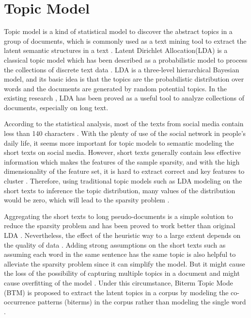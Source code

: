 \section{Topic Model}\label{topicmodel}
Topic model is a kind of statistical model to discover the abstract topics in a group of documents, which is commonly used as a text mining tool to extract the latent semantic structures in a text \cite{enwiki:1014350876}. Latent Dirichlet Allocation(LDA) is a classical topic model which has been described as a probabilistic model to process the collections of discrete text data \cite{blei2003latent}. LDA is a three-level hierarchical Bayesian model, and its basic idea is that the topics are the probabilistic distribution over words and the documents are generated by random potential topics. In the existing research \cite{wallach2009rethinking}, LDA has been proved as a useful tool to analyze collections of documents, especially on long text.

According to the statistical analysis, most of the texts from social media contain less than 140 characters \cite{clark2016sifting}. With the plenty of use of the social network in people's daily life, it seems more important for topic models to semantic modeling the short texts on social media. However, short texts generally contain less effective information which makes the features of the sample sparsity, and with the high dimensionality of the feature set, it is hard to extract correct and key features to cluster \cite{tommasel2018short}. Therefore, using traditional topic models such as LDA modeling on the short texts 
to inference the topic distribution, many values of the distribution would be zero, which will lead to the sparsity problem \cite{tang2014understanding}.

Aggregating the short texts to long pseudo-documents is a simple solution to reduce the sparsity problem and has been proved to work better than original LDA \cite{hong2010empirical}. Nevertheless, the effect of the heuristic way to a large extent depends on the quality of data \cite{cheng2014btm}. Adding strong assumptions on the short texts such as assuming each word in the same sentence has the same topic \cite{gruber2007hidden} is also helpful to alleviate the sparsity problem since it can simplify the model. But it might cause the loss of the possibility of capturing multiple topics in a document and might cause overfitting of the model \cite{blei2003latent}. Under this circumstance, Biterm Topic Mode (BTM) is proposed to extract the latent topics in a corpus by modeling the co-occurrence patterns (biterms) in the corpus rather than modeling the single word \cite{cheng2014btm}.

